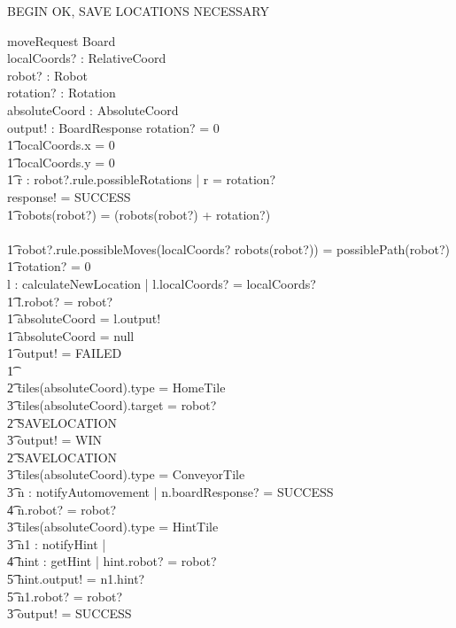 \documentclass[a4paper,11pt]{article}
\begin{document}
BEGIN OK, SAVE LOCATIONS NECESSARY
\begin{schema}{moveRequest}
\Delta Board \\
localCoords? : RelativeCoord \\
robot? : Robot \\
rotation? : Rotation \\
absoluteCoord : AbsoluteCoord \\
output! : BoardResponse
\where
\IF rotation? \not = 0 \\ \t1
localCoords.x = 0 \\ \t1
localCoords.y = 0 \\ \t1
 \exists r : robot?.rule.possibleRotations | r = rotation?\\
\THEN response! = SUCCESS \\ \t1
robots(robot?) = (robots(robot?) + rotation?)  \\
\ELSE \\ \t1
\IF robot?.rule.possibleMoves(localCoords? \cross robots(robot?)) = possiblePath(robot?) \\ \t1
rotation? = 0 \\
\THEN \exists l : calculateNewLocation | l.localCoords? = localCoords? \\ \t1
l.robot? = robot? \\ \t1
absoluteCoord = l.output! \\ \t1
\IF absoluteCoord = null \\ \t1
\THEN output! = FAILED \\ \t1
\ELSE \\ \t2
\IF tiles(absoluteCoord).type = HomeTile \\ \t3
tiles(absoluteCoord).target = robot? \\ \t2
\THEN SAVELOCATION \\ \t3
output! = WIN \\ \t2
\ELSE SAVELOCATION \\ \t3
\IF tiles(absoluteCoord).type = ConveyorTile \\ \t3
\THEN \exists n : notifyAutomovement | n.boardResponse? = SUCCESS \\ \t4
n.robot? = robot? \\ \t3
\IF tiles(absoluteCoord).type = HintTile \\ \t3
\THEN \exists n1 : notifyHint | \\ \t4
\exists hint : getHint | hint.robot? = robot? \\ \t5
hint.output! = n1.hint? \\ \t5
n1.robot? = robot? \\ \t3
output! = SUCCESS
\end{schema}
\end{document}
